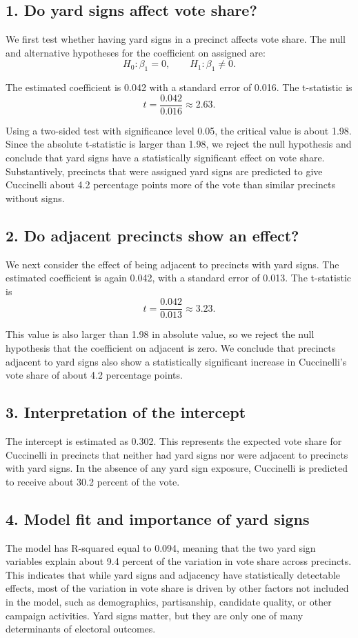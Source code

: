 \documentclass[12pt]{article}
\begin{document}
	\subsection*{1. Do yard signs affect vote share?}
	
	We first test whether having yard signs in a precinct affects vote
	share. The null and alternative hypotheses for the coefficient on
	assigned are:
	\[
	H_0: \beta_1 = 0, \qquad H_1: \beta_1 \neq 0.
	\]
	
	The estimated coefficient is 0.042 with a standard error of 0.016. The
	t-statistic is
	\[
	t = \frac{0.042}{0.016} \approx 2.63.
	\]
	
	Using a two-sided test with significance level 0.05, the critical value
	is about 1.98. Since the absolute t-statistic is larger than 1.98, we
	reject the null hypothesis and conclude that yard signs have a
	statistically significant effect on vote share. Substantively, precincts
	that were assigned yard signs are predicted to give Cuccinelli about
	4.2 percentage points more of the vote than similar precincts without
	signs.
	
	\subsection*{2. Do adjacent precincts show an effect?}
	
	We next consider the effect of being adjacent to precincts with yard
	signs. The estimated coefficient is again 0.042, with a standard error
	of 0.013. The t-statistic is
	\[
	t = \frac{0.042}{0.013} \approx 3.23.
	\]
	
	This value is also larger than 1.98 in absolute value, so we reject the
	null hypothesis that the coefficient on adjacent is zero. We conclude
	that precincts adjacent to yard signs also show a statistically
	significant increase in Cuccinelli's vote share of about 4.2 percentage
	points.
	
	\subsection*{3. Interpretation of the intercept}
	
	The intercept is estimated as 0.302. This represents the expected vote
	share for Cuccinelli in precincts that neither had yard signs nor were
	adjacent to precincts with yard signs. In the absence of any yard sign
	exposure, Cuccinelli is predicted to receive about 30.2 percent of the
	vote.
	
	\subsection*{4. Model fit and importance of yard signs}
	
	The model has R-squared equal to 0.094, meaning that the two yard sign
	variables explain about 9.4 percent of the variation in vote share
	across precincts. This indicates that while yard signs and adjacency
	have statistically detectable effects, most of the variation in vote
	share is driven by other factors not included in the model, such as
	demographics, partisanship, candidate quality, or other campaign
	activities. Yard signs matter, but they are only one of many
	determinants of electoral outcomes.
	
\end{document}
